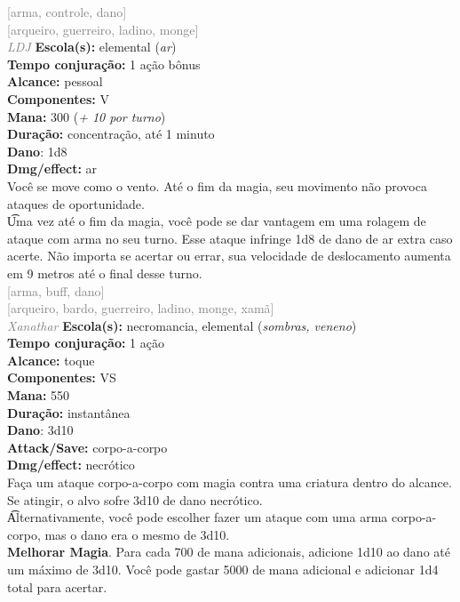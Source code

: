 \documentclass{RPG_Adventure}[2021/10/20]
\begin{document}
{\scriptsize \textcolor{gray}{[arma, controle, dano]\\}}
{\scriptsize \textcolor{gray}{[arqueiro, guerreiro, ladino, monge]\\}}
{\tiny \textcolor{gray}{\textit{LDJ}}}\jump{}
{\small \t \textbf{Escola(s):} elemental (\textit{ar})\\\t \textbf{Tempo conjuração:} 1 ação bônus\\\t \textbf{Alcance:} pessoal\\\t \textbf{Componentes:} V\\\t \textbf{Mana:} 300 (\textit{+ 10 por turno})\\\t \textbf{Duração:} concentração, até 1 minuto\\\t \textbf{Dano}: 1d8\\\t \textbf{Dmg/effect:} ar\\}
{\normalsize Você se move como o vento. Até o fim da magia, seu movimento não provoca ataques de oportunidade.\\\t Uma vez até o fim da magia, você pode se dar vantagem em uma rolagem de ataque com arma no seu turno. Esse ataque infringe 1d8 de dano de ar extra caso acerte. Não importa se acertar ou errar, sua velocidade de deslocamento aumenta em 9 metros até o final desse turno.\\}
{\scriptsize \textcolor{gray}{[arma, buff, dano]\\}}
{\scriptsize \textcolor{gray}{[arqueiro, bardo, guerreiro, ladino, monge, xamã]\\}}
{\tiny \textcolor{gray}{\textit{Xanathar}}}\jump{}
{\small \t \textbf{Escola(s):} necromancia, elemental (\textit{sombras, veneno})\\\t \textbf{Tempo conjuração:} 1 ação\\\t \textbf{Alcance:} toque\\\t \textbf{Componentes:} VS\\\t \textbf{Mana:} 550\\\t \textbf{Duração:} instantânea\\\t \textbf{Dano}: 3d10\\\t \textbf{Attack/Save:} corpo-a-corpo\\\t \textbf{Dmg/effect:} necrótico\\}
{\normalsize Faça um ataque corpo-a-corpo com magia contra uma criatura dentro do alcance. Se atingir, o alvo sofre 3d10 de dano necrótico.\\\t Alternativamente, você pode escolher fazer um ataque com uma arma corpo-a-corpo, mas o dano era o mesmo de 3d10.\\\t \textbf{Melhorar Magia}. Para cada 700 de mana adicionais, adicione 1d10 ao dano até um máximo de 3d10. Você pode gastar 5000 de mana adicional e adicionar 1d4 total para acertar.\\}
\end{document}
